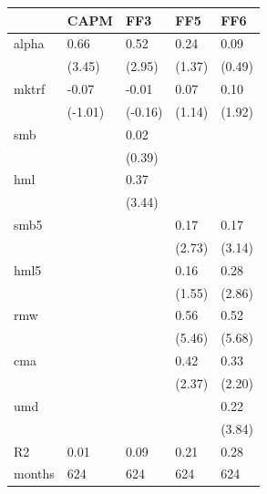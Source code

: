 \begin{tabular}{lllll}
\toprule
 & CAPM & FF3 & FF5 & FF6 \\
\midrule
alpha & 0.66 & 0.52 & 0.24 & 0.09 \\
 & (3.45) & (2.95) & (1.37) & (0.49) \\
mktrf & -0.07 & -0.01 & 0.07 & 0.10 \\
 & (-1.01) & (-0.16) & (1.14) & (1.92) \\
smb &  & 0.02 &  &  \\
 &  & (0.39) &  &  \\
hml &  & 0.37 &  &  \\
 &  & (3.44) &  &  \\
smb5 &  &  & 0.17 & 0.17 \\
 &  &  & (2.73) & (3.14) \\
hml5 &  &  & 0.16 & 0.28 \\
 &  &  & (1.55) & (2.86) \\
rmw &  &  & 0.56 & 0.52 \\
 &  &  & (5.46) & (5.68) \\
cma &  &  & 0.42 & 0.33 \\
 &  &  & (2.37) & (2.20) \\
umd &  &  &  & 0.22 \\
 &  &  &  & (3.84) \\
R2 & 0.01 & 0.09 & 0.21 & 0.28 \\
months & 624 & 624 & 624 & 624 \\
\bottomrule
\end{tabular}
